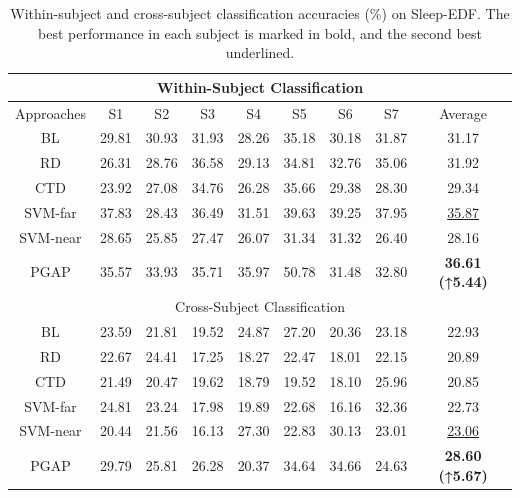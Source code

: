 \documentclass[journal,twocolumn]{IEEEtran}
\begin{document}
\begin{table}[htpb] \centering
  \caption{Within-subject and cross-subject classification accuracies (\%) on Sleep-EDF. The best performance in each subject is marked in bold, and the second best underlined.}
  \label{tab:sleep-edfx-result}
  \begin{tabular}{c|c|c|c|c|c|c|c|c}
  \toprule
  \multicolumn{9}{c}{Within-Subject Classification} \\
  \midrule
  Approaches & S1 & S2 & S3 & S4 & S5 & S6 & S7 & Average \\
  \midrule
  BL & 29.81 & 30.93 & 31.93 & 28.26 & 35.18 & 30.18 & 31.87 & 31.17 \\
  RD & 26.31 & 28.76 & 36.58 & 29.13 & 34.81 & 32.76 & 35.06 & 31.92 \\
  CTD & 23.92 & 27.08 & 34.76 & 26.28 & 35.66 & 29.38 & 28.30 & 29.34 \\
  SVM-far & 37.83 & 28.43 & 36.49 & 31.51 & 39.63 & 39.25 & 37.95 & \underline{35.87} \\
  SVM-near & 28.65 & 25.85 & 27.47 & 26.07 & 31.34 & 31.32 & 26.40 & 28.16 \\
  PGAP & 35.57 & 33.93 & 35.71 & 35.97 & 50.78 & 31.48 & 32.80 & \textbf{36.61 (↑5.44)} \\
  \midrule
  \multicolumn{9}{c}{Cross-Subject Classification} \\
  \midrule
  BL & 23.59 & 21.81 & 19.52 & 24.87 & 27.20 & 20.36 & 23.18 & 22.93 \\
  RD & 22.67 & 24.41 & 17.25 & 18.27 & 22.47 & 18.01 & 22.15 & 20.89 \\
  CTD & 21.49 & 20.47 & 19.62 & 18.79 & 19.52 & 18.10 & 25.96 & 20.85 \\
  SVM-far & 24.81 & 23.24 & 17.98 & 19.89 & 22.68 & 16.16 & 32.36 & 22.73 \\
  SVM-near & 20.44 & 21.56 & 16.13 & 27.30 & 22.83 & 30.13 & 23.01 & \underline{23.06} \\
  PGAP & 29.79 & 25.81 & 26.28 & 20.37 & 34.64 & 34.66 & 24.63 & \textbf{28.60 (↑5.67)} \\
  \bottomrule
  \end{tabular}
\end{table}
\end{document}
